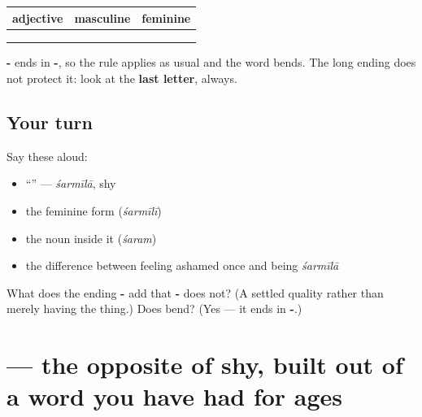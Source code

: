 \begin{grammarlens}[title={Grammar Lens: back to the bending shape}]
\noindent
\begin{tabularx}{\linewidth}{@{}>{\raggedright\arraybackslash}X>{\raggedright\arraybackslash}X>{\raggedright\arraybackslash}X@{}}
\toprule
\textbf{adjective} & \textbf{masculine} & \textbf{feminine} \\
\midrule
\hi{बुरा} & \hi{बुरा} & \hi{बुरी} \\
\hi{मेहनती} & \hi{मेहनती} & \hi{मेहनती} \\
\hi{शर्मीला} & \hi{शर्मीला} & \hi{शर्मीली} \\
\bottomrule
\end{tabularx}

\textbf{-} ends in \textbf{-}, so the rule applies as usual and the word bends. The long ending does not protect it: look at the \textbf{last letter}, always.
\end{grammarlens}

\subsection*{Your turn}
Say these aloud:

\begin{itemize}
\raggedright
  \item \textquotedblleft{}\textquotedblright{} — \emph{śarmīlā}, shy
  \item the feminine form (\emph{śarmīlī})
  \item the noun inside it (\emph{śaram})
  \item the difference between feeling ashamed once and being \emph{śarmīlā}
\end{itemize}

\begin{tcolorbox}[breakable,colback=teal!4,colframe=teal!35!black,title={Before you move on}]
What does the ending \textbf{-} add that \textbf{-} does not? (A settled quality rather than merely having the thing.) Does \textbf{} bend? (Yes — it ends in \textbf{-}.)
\end{tcolorbox}
\section[\texorpdfstring{\hi{मिलनसार} (milansār)}{मिलनसार (milansār)}]{ — the opposite of shy, built out of a word you have had for ages}

\label{lesson:HI-C83-milansaar}



